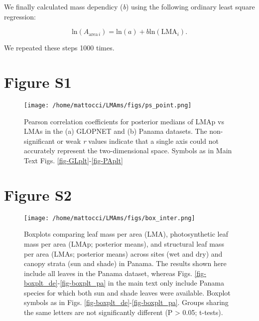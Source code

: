 \documentclass[
  12pt,
  letterpaper,
  DIV=11,
  numbers=noendperiod]{scrartcl}
\begin{document}
We finally calculated mass dependicy (\emph{b}) using the following
ordinary least square regression:

\[
\mathrm{ln}(A_{\mathrm{area} \, i}) = \mathrm{ln}(a) + b \mathrm{ln}(\mathrm{LMA}_{i}).
\]

We repeated these steps 1000 times.

\newpage

\hypertarget{figure-s1}{%
\section{Figure S1}\label{figure-s1}}

\begin{figure}

{\centering \texttt{[image: /home/mattocci/LMAms/figs/ps\_point.png]}

}

\caption{\label{fig-LMAp_LMAs}Pearson correlation coefficients for
posterior medians of LMAp vs LMAs in the (a) GLOPNET and (b) Panama
datasets. The non-significant or weak \emph{r} values indicate that a
single axis could not accurately represent the two-dimensional space.
Symbols as in Main Text Figs. \ref{fig-GLplt}-\ref{fig-PAplt}}

\end{figure}

\newpage

\hypertarget{figure-s2}{%
\section{Figure S2}\label{figure-s2}}

\begin{figure}

{\centering \texttt{[image: /home/mattocci/LMAms/figs/box\_inter.png]}

}

\caption{\label{fig-box_inter}Boxplots comparing leaf mass per area
(LMA), photosynthetic leaf mass per area (LMAp; posterior means), and
structural leaf mass per area (LMAs; posterior means) across sites (wet
and dry) and canopy strata (sun and shade) in Panama. The results shown
here include all leaves in the Panama dataset, whereas Figs.
\ref{fig-boxplt_de}-\ref{fig-boxplt_pa} in the main text only include
Panama species for which both sun and shade leaves were available.
Boxplot symbols as in Figs. \ref{fig-boxplt_de}-\ref{fig-boxplt_pa}.
Groups sharing the same letters are not significantly different (P
\textgreater{} 0.05; t-tests).}

\end{figure}
\end{document}
